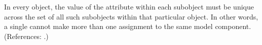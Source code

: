 In every \Event object, the value of the attribute  within
each \EventAssignment subobject must be unique across the set of all such
\EventAssignment subobjects within that particular \Event object.  In other
words, a single \Event cannot make more than one assignment to the same
model component.  (References: .)
